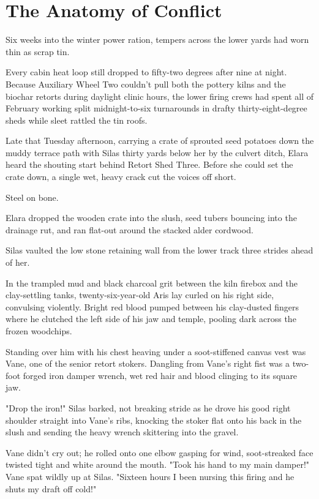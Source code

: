 \chapter{The Anatomy of Conflict}

Six weeks into the winter power ration, tempers across the lower yards had worn thin as scrap tin.

Every cabin heat loop still dropped to fifty-two degrees after nine at night. Because Auxiliary Wheel Two couldn't pull both the pottery kilns and the biochar retorts during daylight clinic hours, the lower firing crews had spent all of February working split midnight-to-six turnarounds in drafty thirty-eight-degree sheds while sleet rattled the tin roofs.

Late that Tuesday afternoon, carrying a crate of sprouted seed potatoes down the muddy terrace path with Silas thirty yards below her by the culvert ditch, Elara heard the shouting start behind Retort Shed Three. Before she could set the crate down, a single wet, heavy crack cut the voices off short.

Steel on bone.

Elara dropped the wooden crate into the slush, seed tubers bouncing into the drainage rut, and ran flat-out around the stacked alder cordwood.

Silas vaulted the low stone retaining wall from the lower track three strides ahead of her.

In the trampled mud and black charcoal grit between the kiln firebox and the clay-settling tanks, twenty-six-year-old Aris lay curled on his right side, convulsing violently. Bright red blood pumped between his clay-dusted fingers where he clutched the left side of his jaw and temple, pooling dark across the frozen woodchips.

Standing over him with his chest heaving under a soot-stiffened canvas vest was Vane, one of the senior retort stokers. Dangling from Vane's right fist was a two-foot forged iron damper wrench, wet red hair and blood clinging to its square jaw.

"Drop the iron!" Silas barked, not breaking stride as he drove his good right shoulder straight into Vane's ribs, knocking the stoker flat onto his back in the slush and sending the heavy wrench skittering into the gravel.

Vane didn't cry out; he rolled onto one elbow gasping for wind, soot-streaked face twisted tight and white around the mouth. "Took his hand to my main damper!" Vane spat wildly up at Silas. "Sixteen hours I been nursing this firing and he shuts my draft off cold!"

